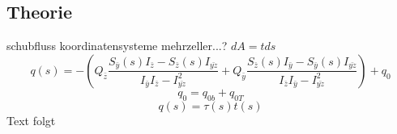 
\subsection{Theorie}
schubfluss
koordinatensysteme
mehrzeller...?
$dA=tds$
\begin{equation}\label{qs}
	q(s)=-(Q_{\bar{z}}\frac{S_{\bar{y}}(s)I_{\bar{z}}-S_{\bar{z}}(s)I_{\bar{yz}}}{I_{\bar{y}}I_{\bar{z}}-I_{\bar{yz}}^2}+Q_{\bar{y}}\frac{S_{\bar{z}}(s)I_{\bar{y}}-S_{\bar{y}}(s)I_{\bar{yz}}}{I_{\bar{z}}I_{\bar{y}}-I_{\bar{yz}}^2})+q_0
\end{equation}
\begin{equation}
	q_{0} = q_{0b}+q_{0T}
\end{equation}
\begin{equation}\label{tau}
	q(s)=\tau(s)t(s)
\end{equation}
Text folgt

